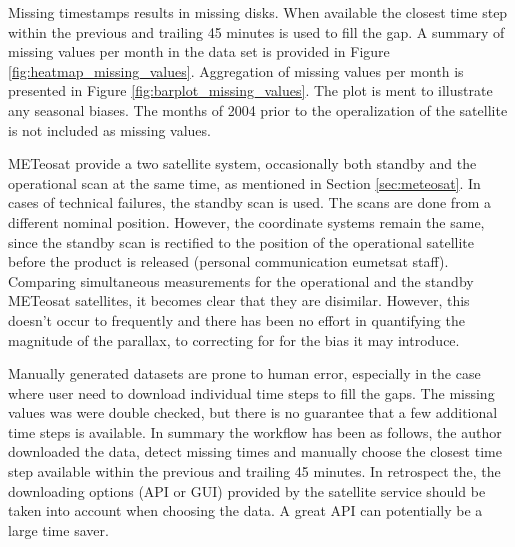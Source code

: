 Missing timestamps results in missing disks. When available the closest time step within the previous and trailing 45 minutes is used to fill the gap. A summary of missing values per month in the data set is provided in Figure \ref{fig:heatmap_missing_values}. Aggregation of missing values per month is presented in Figure \ref{fig:barplot_missing_values}. The plot is ment to illustrate any seasonal biases. The months of 2004 prior to the operalization of the satellite is not included as missing values.

METeosat provide a two satellite system, occasionally both standby and the operational scan at the same time, as mentioned in Section \ref{sec:meteosat}.
In cases of technical failures, the standby scan is used. The scans are done from a different nominal position. However, the coordinate systems remain the same, since the standby scan is rectified to the position of the operational satellite before the product is released (personal communication \acrshort{eumetsat} staff). Comparing simultaneous measurements for the operational and the standby METeosat satellites, it becomes clear that they are disimilar. However, this doesn't occur to frequently and there has been no effort in quantifying the magnitude of the parallax, to correcting for for the bias it may introduce.

Manually generated datasets are prone to human error, especially in the case where user need to download individual time steps to fill the gaps. The missing values was were double checked, but there is no guarantee that a few additional time steps is available. In summary the workflow has been as follows, the author downloaded the data, detect missing times and manually choose the closest time step available within the previous and trailing 45 minutes. In retrospect the, the downloading options (API or GUI) provided by the satellite service should be taken into account when choosing the data. A great API can potentially be a large time saver.

